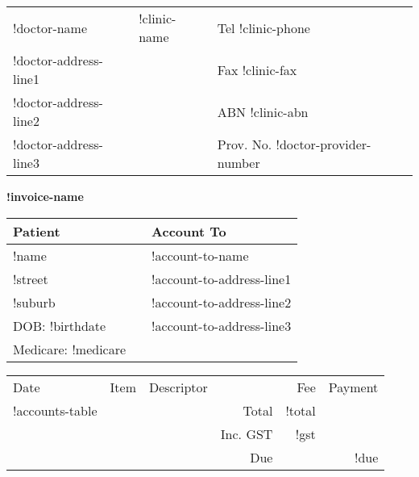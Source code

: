 \documentclass[12pt]{article}
\begin{document}
\begin{center}
\begin{tabular}{p{}>{\centering}p{}<{\centering}p{}<{\raggedleft}}
!doctor-name & {\Large !clinic-name } & Tel !clinic-phone \\
!doctor-address-line1 &  & Fax !clinic-fax \\
!doctor-address-line2 & & ABN !clinic-abn \\
!doctor-address-line3 & & Prov. No. !doctor-provider-number\\ 
\hline
\end{tabular}

\vspace{7mm}

{ \Large \textbf{!invoice-name} }

\end{center}

\vspace{7mm}

\begin{tabular}{lp{5mm}l} 
Patient & & Account To \\ \midrule
!name & & !account-to-name\\
!street & & !account-to-address-line1 \\
!suburb & & !account-to-address-line2 \\
DOB: !birthdate &  & !account-to-address-line3 \\
Medicare:   !medicare & & \\ 
\end{tabular}

\vspace{7mm}

\begin{tabularx}{\textwidth}{llXrrr}
Date & Item & Descriptor & & Fee & Payment \\ \cmidrule(l){1-6}
!accounts-table
\cmidrule(l){5-6}
& & & Total & !total  & \\
& & & Inc. GST & !gst & \\ \cmidrule(l){5-6}
& & & Due & & !due \\

\end{tabularx}
\end{document}
